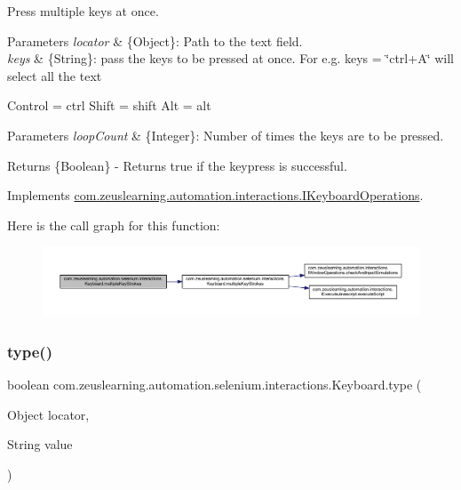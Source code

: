 Press multiple keys at once.


\begin{DoxyParams}{Parameters}
{\em locator} & \{Object\}\+: Path to the text field. \\
\hline
{\em keys} & \{String\}\+: pass the keys to be pressed at once. For e.\+g. keys = \char`\"{}ctrl+\+A\char`\"{} will select all the text\\
\hline
\end{DoxyParams}
Control = ctrl Shift = shift Alt = alt 
\begin{DoxyParams}{Parameters}
{\em loop\+Count} & \{Integer\}\+: Number of times the keys are to be pressed.\\
\hline
\end{DoxyParams}
\begin{DoxyReturn}{Returns}
\{Boolean\} -\/ Returns {\ttfamily true} if the keypress is successful. 
\end{DoxyReturn}


Implements \hyperlink{interfacecom_1_1zeuslearning_1_1automation_1_1interactions_1_1IKeyboardOperations_a8638a90fc1cc0d6f31b7bf8394299d66}{com.\+zeuslearning.\+automation.\+interactions.\+I\+Keyboard\+Operations}.

Here is the call graph for this function\+:
\nopagebreak
\begin{figure}[H]
\begin{center}
\leavevmode
\includegraphics[width=350pt]{d1/d26/classcom_1_1zeuslearning_1_1automation_1_1selenium_1_1interactions_1_1Keyboard_a99da211274aa02b2c3611d1db275996f_cgraph}
\end{center}
\end{figure}
\hypertarget{classcom_1_1zeuslearning_1_1automation_1_1selenium_1_1interactions_1_1Keyboard_ac169af3cdaa7e24a4ec048c70540aaa1}{}\label{classcom_1_1zeuslearning_1_1automation_1_1selenium_1_1interactions_1_1Keyboard_ac169af3cdaa7e24a4ec048c70540aaa1} 
\subsubsection{\texorpdfstring{type()}{type()}}
{\footnotesize\ttfamily boolean com.\+zeuslearning.\+automation.\+selenium.\+interactions.\+Keyboard.\+type (\begin{DoxyParamCaption}\item[{Object}]{locator,  }\item[{String}]{value }\end{DoxyParamCaption})\hspace{0.3cm}{\ttfamily [inline]}}


